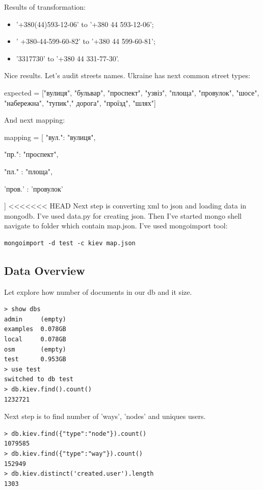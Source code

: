 \documentclass[a4paper,12pt]{article}
\begin{document}
Results of transformation:
\begin{itemize}
\item '+380(44)593-12-06' to '+380 44 593-12-06';
\item ' +380-44-599-60-82' to '+380 44 599-60-81';
\item '3317730' to '+380 44 331-77-30'.
\end{itemize}
Nice results. Let's audit streets names. Ukraine has next common street types:\par
expected = ["\foreignlanguage{russian}{вулиця}",  "\foreignlanguage{russian}{бульвар}", "\foreignlanguage{russian}{проспект}", "\foreignlanguage{russian}{узвіз}", "\foreignlanguage{russian}{площа}", "\foreignlanguage{russian}{провулок}", "\foreignlanguage{russian}{шосе}", "\foreignlanguage{russian}{набережна}", "\foreignlanguage{russian}{тупик}"," \foreignlanguage{russian}{дорога}", "\foreignlanguage{russian}{проїзд}", "\foreignlanguage{russian}{шлях}"]\par
And next mapping:\par
mapping = [ "\foreignlanguage{russian}{вул.}": "\foreignlanguage{russian}{вулиця}",\par
            "\foreignlanguage{russian}{пр}.": "\foreignlanguage{russian}{проспект}",\par
            "\foreignlanguage{russian}{пл.}" : "\foreignlanguage{russian}{площа}",\par
            '\foreignlanguage{russian}{пров.}' : '\foreignlanguage{russian}{провулок}'\par
]
<<<<<<< HEAD
Next step is converting xml to json and loading data in mongodb. I've used data.py for creating json. Then I've started mongo shell navigate to folder which contain map.json. I've used mongoimport tool:
\begin{lstlisting}[style=DOS]
 mongoimport -d test -c kiev map.json
\end{lstlisting}
\subsection*{Data Overview}
Let explore how number of documents in our db and it size.
\begin{lstlisting}[caption={Size and number of documents in db.},style=DOS]
> show dbs
admin     (empty)
examples  0.078GB
local     0.078GB
osm       (empty)
test      0.953GB
> use test
switched to db test
> db.kiev.find().count()
1232721
\end{lstlisting}
Next step is to find number of 'ways', 'nodes' and uniques users.
\begin{lstlisting}[style=DOS,caption={Basic statistics}]
> db.kiev.find({"type":"node"}).count()
1079585
> db.kiev.find({"type":"way"}).count()
152949
> db.kiev.distinct('created.user').length
1303
\end{lstlisting}
\end{document}
